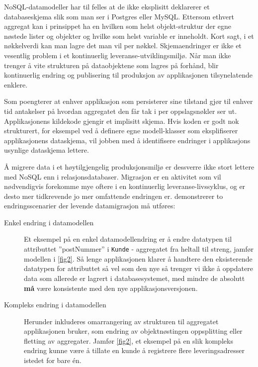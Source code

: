 NoSQL-datamodeller har til felles at de ikke eksplisitt deklarerer et databaseskjema slik som man ser i Postgres eller MySQL. Ettersom ethvert aggregat kan i prinsippet ha en hvilken som helst objekt-struktur der egne nøstede lister og objekter og hvilke som helst variable er inneholdt. Kort sagt, i et nøkkelverdi kan man lagre det man vil per nøkkel. Skjemaendringer er ikke et vesentlig problem i et kontinuerlig leveranse-utviklingsmiljø. Når man ikke trenger å vite strukturen på dataobjektene som lagres på forhånd, blir kontinuerlig endring og publisering til produksjon av applikasjonen tilsynelatende enklere.

Som \cite{sadalage2013} poengterer at enhver applikasjon som persisterer sine tilstand gjør til enhver tid antakelser på hvordan aggregatet den får tak i per oppslagsnøkler ser ut. Applikasjonens kildekode gjengir et implisitt skjema. Hvis koden er godt nok strukturert, for eksempel ved å definere egne modell-klasser som eksplifiserer applikasjonens dataskjema, vil jobben med å identifisere endringer i applikasjons usynlige dataskjema lettere.

Å migrere data i et høytilgjengelig produksjonsmiljø er dessverre ikke stort lettere med NoSQL enn i relasjonsdatabaser. Migrasjon er en aktivitet som vil nødvendigvis forekomme mye oftere i en kontinuerlig leveranse-livssyklus, og er desto mer tidkrevende jo mer omfattende endringen er. \cite{hauer2015} demonstrerer to endringsscenarier der levende datamigrasjon må utføres:

\begin{description}
  \item [Enkel endring i datamodellen] Et eksempel på en enkel datamodellendring er å endre datatypen til attributtet ''postNummer'' i \texttt{Kunde} - aggregatet fra heltall til streng, jamfør modellen i \ref{fig2}. Så lenge applikasjonen klarer å handtere den eksisterende datatypen for attributtet så vel som den nye så trenger vi ikke å oppdatere data som allerede er lagrert i databasesystemet, med mindre de absolutt \textbf{må} være konsistente med den nye applikasjonsversjonen.
  \item [Kompleks endring i datamodellen] Herunder inkluderes omarrangering av strukturen til aggregatet applikasjonen bruker, som endring av objektnøstingen oppsplitting eller fletting av aggregater. Jamfør \ref{fig2}, et eksempel på en slik kompleks endring kunne være å tillate en kunde å registrere flere leveringsadresser istedet for bare én.
\end{description}

